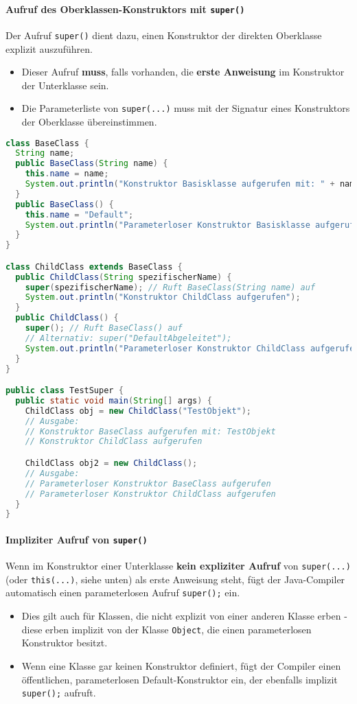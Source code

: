 \paragraph{Aufruf des Oberklassen-Konstruktors mit \texttt{super()}}
Der Aufruf \texttt{super()} dient dazu, einen Konstruktor der direkten Oberklasse explizit auszuführen.
\begin{itemize}
  \item Dieser Aufruf \textbf{muss}, falls vorhanden, die \textbf{erste Anweisung} im
        Konstruktor der Unterklasse sein.
  \item Die Parameterliste von \texttt{super(...)} muss mit der Signatur eines
        Konstruktors der Oberklasse übereinstimmen.
\end{itemize}

\begin{lstlisting}[language=Java, caption={Expliziter Aufruf des Oberklassen-Konstruktors via \texttt{super()}}]
class BaseClass {
  String name;
  public BaseClass(String name) {
    this.name = name;
    System.out.println("Konstruktor Basisklasse aufgerufen mit: " + name);
  }
  public BaseClass() {
    this.name = "Default";
    System.out.println("Parameterloser Konstruktor Basisklasse aufgerufen");
  }
}

class ChildClass extends BaseClass {
  public ChildClass(String spezifischerName) {
    super(spezifischerName); // Ruft BaseClass(String name) auf
    System.out.println("Konstruktor ChildClass aufgerufen");
  }
  public ChildClass() {
    super(); // Ruft BaseClass() auf
    // Alternativ: super("DefaultAbgeleitet");
    System.out.println("Parameterloser Konstruktor ChildClass aufgerufen");
  }
}

public class TestSuper {
  public static void main(String[] args) {
    ChildClass obj = new ChildClass("TestObjekt");
    // Ausgabe:
    // Konstruktor BaseClass aufgerufen mit: TestObjekt
    // Konstruktor ChildClass aufgerufen

    ChildClass obj2 = new ChildClass();
    // Ausgabe:
    // Parameterloser Konstruktor BaseClass aufgerufen
    // Parameterloser Konstruktor ChildClass aufgerufen
  }
}
\end{lstlisting}

\paragraph{Impliziter Aufruf von \texttt{super()}}
Wenn im Konstruktor einer Unterklasse \textbf{kein expliziter Aufruf} von \texttt{super(...)} (oder \texttt{this(...)}, siehe unten)
als erste Anweisung steht, fügt der Java-Compiler automatisch einen parameterlosen Aufruf \texttt{super();} ein.
\begin{itemize}
  \item Dies gilt auch für Klassen, die nicht explizit von einer anderen Klasse erben -
        diese erben implizit von der Klasse \texttt{Object}, die einen parameterlosen
        Konstruktor besitzt.
  \item Wenn eine Klasse gar keinen Konstruktor definiert, fügt der Compiler einen
        öffentlichen, parameterlosen Default-Konstruktor ein, der ebenfalls implizit
        \texttt{super();} aufruft.
\end{itemize}

